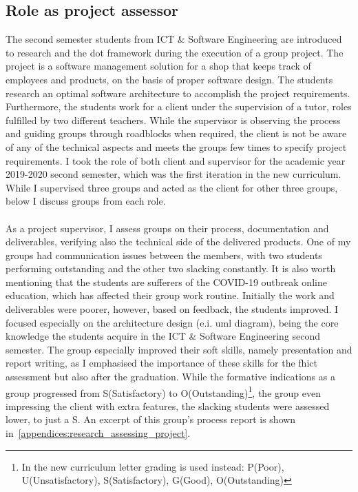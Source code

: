 \subsection{Role as project assessor} \label{subsection:role_project_assessor}
The second semester students from ICT \& Software Engineering are introduced to research and the \acrshort{dot} framework during the execution of a group project. 
The project is a software management solution for a shop that keeps track of employees and products, on the basis of proper software design. 
The students research an optimal software architecture to accomplish the project requirements. 
Furthermore, the students work for a client under the supervision of a tutor, roles fulfilled by two different teachers. 
While the supervisor is observing the process and guiding groups through roadblocks when required, the client is not be aware of any of the technical aspects and meets the groups few times to specify project requirements.
I took the role of both client and supervisor for the academic year 2019-2020 second semester, which was the first iteration in the new curriculum. While I supervised three groups and acted as the client for other three groups, below I discuss groups from each role.
\\\\
As a project supervisor, I assess groups on their process, documentation and deliverables, verifying also the technical side of the delivered products. One of my groups had communication issues between the members, with two students performing outstanding and the other two slacking constantly. It is also worth mentioning that the students are sufferers of the COVID-19 outbreak online education, which has affected their group work routine. Initially the work and deliverables were poorer, however, based on feedback, the students improved. I focused especially on the architecture design (e.i. \acrshort{uml} diagram), being the core knowledge the students acquire in the ICT \& Software Engineering second semester. The group especially improved their soft skills, namely presentation and report writing, as I emphasised the importance of these skills for the \acrshort{fhict} assessment but also after the graduation. While the formative indications as a group progressed from S(Satisfactory) to O(Outstanding)\footnote{In the new curriculum letter grading is used instead: P(Poor), U(Unsatisfactory), S(Satisfactory), G(Good), O(Outstanding)}, the group even impressing the client with extra features, the slacking students were assessed lower, to just a S. An excerpt of this group's process report is shown in~\cref{appendices:research_assessing_project}.
